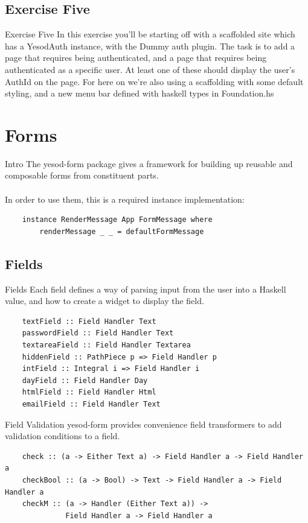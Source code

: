 \documentclass[pdf]{beamer}
\begin{document}
\subsection{Exercise Five}
\begin{frame}{Exercise Five}
  In this exercise you'll be starting off with a scaffolded site which
  has a YesodAuth instance, with the Dummy auth plugin. The task is to
  add a page that requires being authenticated, and a page that
  requires being authenticated as a specific user. At least one of
  these should display the user's AuthId on the page. For here on
  we're also using a scaffolding with some default styling, and a new
  menu bar defined with haskell types in Foundation.hs
\end{frame}

\section{Forms}
\begin{frame}[fragile]{Intro}
  The yesod-form package gives a framework for building up reusable
  and composable forms from constituent parts.\\
  \\
  \pause
  In order to use them, this is a required instance implementation:
  \begin{verbatim}
    instance RenderMessage App FormMessage where
        renderMessage _ _ = defaultFormMessage
  \end{verbatim}
\end{frame}

\subsection{Fields}
\begin{frame}[fragile]{Fields}
  Each field defines a way of parsing input from the user into a
  Haskell value, and how to create a widget to display the field.
  \begin{verbatim}
    textField :: Field Handler Text
    passwordField :: Field Handler Text
    textareaField :: Field Handler Textarea
    hiddenField :: PathPiece p => Field Handler p
    intField :: Integral i => Field Handler i
    dayField :: Field Handler Day
    htmlField :: Field Handler Html
    emailField :: Field Handler Text
  \end{verbatim}
\end{frame}

\begin{frame}[fragile]{Field Validation}
  yesod-form provides convenience field transformers to add validation
  conditions to a field.\\
  \begin{verbatim}
    check :: (a -> Either Text a) -> Field Handler a -> Field Handler a
    checkBool :: (a -> Bool) -> Text -> Field Handler a -> Field Handler a
    checkM :: (a -> Handler (Either Text a)) ->
              Field Handler a -> Field Handler a
  \end{verbatim}
\end{frame}
\end{document}
